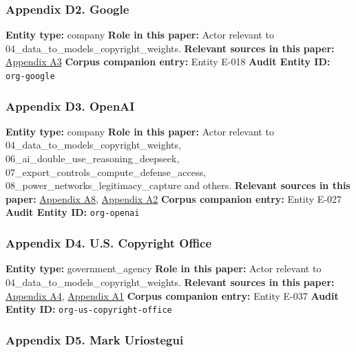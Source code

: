 \documentclass[
  american,
  11pt,
  letterpaper,
]{article}
\begin{document}
\subsubsection{Appendix D2. Google}\label{ch-04-appendix-d2-google}

\textbf{Entity type:} company \textbf{Role in this paper:} Actor
relevant to 04\_data\_to\_models\_copyright\_weights. \textbf{Relevant
sources in this paper:}
\hyperref[ch-04-appendix-a3-reddit-strikes-60m-deal-allowing-google-to-train-ai-models-on-its-posts-unveils-ipo-plans]{Appendix
A3} \textbf{Corpus companion entry:} Entity E-018 \textbf{Audit Entity
ID:} \texttt{org-google}

\subsubsection{Appendix D3. OpenAI}\label{ch-04-appendix-d3-openai}

\textbf{Entity type:} company \textbf{Role in this paper:} Actor
relevant to 04\_data\_to\_models\_copyright\_weights,
06\_ai\_double\_use\_reasoning\_deepseek,
07\_export\_controls\_compute\_defense\_access,
08\_power\_networks\_legitimacy\_capture and others. \textbf{Relevant
sources in this paper:}
\hyperref[ch-04-appendix-a8-the-new-york-times-company-v-microsoft-corporation-et-al-opinion-on-motions-to-dismiss]{Appendix
A8},
\hyperref[ch-04-appendix-a2-language-models-are-unsupervised-multitask-learners]{Appendix
A2} \textbf{Corpus companion entry:} Entity E-027 \textbf{Audit Entity
ID:} \texttt{org-openai}

\subsubsection{Appendix D4. U.S. Copyright
Office}\label{ch-04-appendix-d4-u-s-copyright-office}

\textbf{Entity type:} government\_agency \textbf{Role in this paper:}
Actor relevant to 04\_data\_to\_models\_copyright\_weights.
\textbf{Relevant sources in this paper:}
\hyperref[ch-04-appendix-a4-copyright-and-artificial-intelligence-notice-of-inquiry]{Appendix
A4},
\hyperref[ch-04-appendix-a1-copyright-and-artificial-intelligence-part-3-generative-ai-training-pre-publication-version]{Appendix
A1} \textbf{Corpus companion entry:} Entity E-037 \textbf{Audit Entity
ID:} \texttt{org-us-copyright-office}

\subsubsection{Appendix D5. Mark
Uriostegui}\label{ch-04-appendix-d5-mark-uriostegui}
\end{document}
